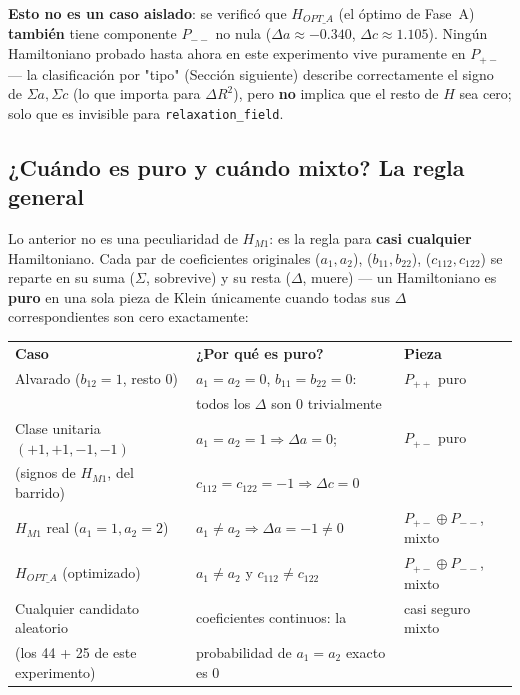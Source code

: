 \documentclass[11pt, a4paper]{article}
\newcommand{\TH}[1]{\cellcolor{cTHbg}\color{white}\textbf{#1}}
\begin{document}
\begin{tcolorbox}[quotebox]
  \textbf{Esto no es un caso aislado}: se verific\'o que
  $H_{OPT\_A}$ (el \'optimo de Fase~A) \textbf{tambi\'en} tiene
  componente $P_{--}$ no nula ($\Delta a\approx-0.340$,
  $\Delta c\approx1.105$). Ning\'un Hamiltoniano probado hasta ahora en
  este experimento vive puramente en $P_{+-}$ --- la clasificaci\'on
  por "tipo" (Secci\'on siguiente) describe correctamente el signo de
  $\Sigma a,\Sigma c$ (lo que importa para $\Delta R^2$), pero
  \textbf{no} implica que el resto de $H$ sea cero; solo que es
  invisible para \texttt{relaxation\_field}.
\end{tcolorbox}

\subsection{¿Cu\'ando es puro y cu\'ando mixto? La regla general}
\label{sec:regla-mixto}

Lo anterior no es una peculiaridad de $H_{M1}$: es la regla para
\textbf{casi cualquier} Hamiltoniano. Cada par de coeficientes
originales ($a_1,a_2$), ($b_{11},b_{22}$), ($c_{112},c_{122}$) se
reparte en su suma ($\Sigma$, sobrevive) y su resta ($\Delta$, muere)
--- un Hamiltoniano es \textbf{puro} en una sola pieza de Klein
\'unicamente cuando todas sus $\Delta$ correspondientes son cero
exactamente:

\medskip
\begin{center}
\begin{tabular}{lll}
  \TH{Caso} & \TH{¿Por qu\'e es puro?} & \TH{Pieza} \\[1pt]
  Alvarado ($b_{12}=1$, resto 0) & $a_1{=}a_2{=}0$, $b_{11}{=}b_{22}{=}0$: & $P_{++}$ puro \\
   & todos los $\Delta$ son 0 trivialmente & \\
  Clase unitaria $(+1,+1,-1,-1)$ & $a_1{=}a_2{=}1\Rightarrow\Delta a{=}0$; & $P_{+-}$ puro \\
  (signos de $H_{M1}$, del barrido) & $c_{112}{=}c_{122}{=}{-}1\Rightarrow\Delta c{=}0$ & \\
  $H_{M1}$ real ($a_1{=}1,a_2{=}2$) & $a_1\neq a_2\Rightarrow\Delta a{=}{-}1\neq0$ & $P_{+-}\oplus P_{--}$, mixto \\
  $H_{OPT\_A}$ (optimizado) & $a_1\neq a_2$ y $c_{112}\neq c_{122}$ & $P_{+-}\oplus P_{--}$, mixto \\
  Cualquier candidato aleatorio & coeficientes continuos: la & casi seguro mixto \\
  (los 44 + 25 de este experimento) & probabilidad de $a_1{=}a_2$ exacto es 0 & \\
\end{tabular}
\end{center}
\medskip
\end{document}
